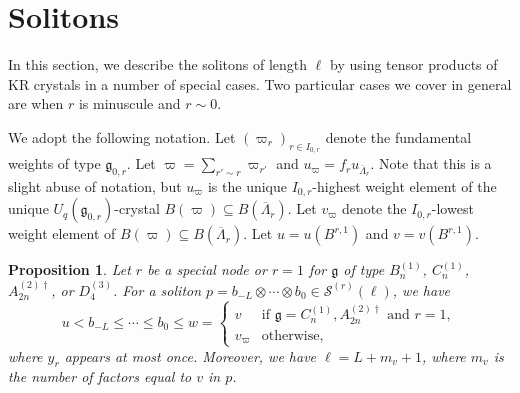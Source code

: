 \documentclass[reqno]{amsart}
\newcommand{\g}{\mathfrak{g}}
\newcommand{\clfw}{\overline{\Lambda}} %
\newcommand{\Sol}{\mathcal{S}} %
\theoremstyle{plain}
\newtheorem{prop}[thm]{Proposition}
\theoremstyle{definition}
\numberwithin{equation}{section}
\begin{document}
\section{Solitons}
\label{sec:solitons}

In this section, we describe the solitons of length $\ell$ by using tensor products of KR crystals in a number of special cases.
Two particular cases we cover in general are when $r$ is minuscule and $r \sim 0$.

We adopt the following notation.
Let $(\varpi_r)_{r \in I_{0,r}}$ denote the fundamental weights of type $\g_{0,r}$.
Let $\varpi = \sum_{r' \sim r} \varpi_{r'}$ and $u_{\varpi} = f_r u_{\clfw_r}$.
Note that this is a slight abuse of notation, but $u_{\varpi}$ is the unique $I_{0,r}$-highest weight element of the unique $U_q(\g_{0,r})$-crystal $B(\varpi) \subseteq B(\clfw_r)$.
Let $v_{\varpi}$ denote the $I_{0,r}$-lowest weight element of $B(\varpi) \subseteq B(\clfw_r)$.
Let $u = u(B^{r,1})$ and $v  = v(B^{r,1})$.

\begin{prop}
\label{prop:soliton_H1}
Let $r$ be a special node or $r = 1$ for $\g$ of type $B_n^{(1)}$, $C_n^{(1)}$, $A_{2n}^{(2)\dagger}$, or $D_4^{(3)}$.
For a soliton $p = b_{-L} \otimes \cdots \otimes b_0 \in \Sol^{(r)}(\ell)$, we have
\[
u < b_{-L} \leq \cdots \leq b_0 \leq w = \begin{cases}
v & \text{if $\g = C_n^{(1)}, A_{2n}^{(2)\dagger}$ and $r = 1$},
\\ v_{\varpi} & \text{otherwise},
\end{cases}
\]
where $y_r$ appears at most once.
Moreover, we have $\ell = L + m_v + 1$, where $m_v$ is the number of factors equal to $v$ in $p$.
\end{prop}
\end{document}
